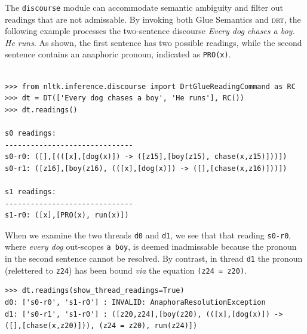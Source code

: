 \documentclass[11pt, a4paper]{article}
\newcommand{\DRT}{\textsc{drt}}
\newcommand{\NLTK}{\textsc{nltk}}
\begin{document}
The \texttt{discourse} module can accommodate semantic 
ambiguity and filter out readings that are not admissable.
By invoking both Glue Semantics and \DRT, the following example processes the 
two-sentence discourse \textit{Every dog chases a boy.  He runs}.  As
shown, the first sentence has two possible readings, while 
the second sentence contains an anaphoric pronoun, indicated as \texttt{PRO(x)}.
\begin{Verbatim}[baselinestretch=.5]

>>> from nltk.inference.discourse import DrtGlueReadingCommand as RC
>>> dt = DT(['Every dog chases a boy', 'He runs'], RC())
>>> dt.readings()

s0 readings:
------------------------------
s0-r0: ([],[(([x],[dog(x)]) -> ([z15],[boy(z15), chase(x,z15)]))])
s0-r1: ([z16],[boy(z16), (([x],[dog(x)]) -> ([],[chase(x,z16)]))])

s1 readings:
------------------------------
s1-r0: ([x],[PRO(x), run(x)])
\end{Verbatim}
When we examine the two threads \texttt{d0} and \texttt{d1}, we see
that that reading \texttt{s0-r0}, where \textit{every dog} out-scopes
\texttt{a boy}, is deemed inadmissable because the pronoun in the
second sentence cannot be resolved.  By contrast, in thread \texttt{d1} the
pronoun (relettered to \texttt{z24}) has been bound \textit{via} the
equation \texttt{(z24 = z20)}.  %
\begin{Verbatim}
>>> dt.readings(show_thread_readings=True)
d0: ['s0-r0', 's1-r0'] : INVALID: AnaphoraResolutionException
d1: ['s0-r1', 's1-r0'] : ([z20,z24],[boy(z20), (([x],[dog(x)]) -> 
([],[chase(x,z20)])), (z24 = z20), run(z24)])
\end{Verbatim}




\end{document}
